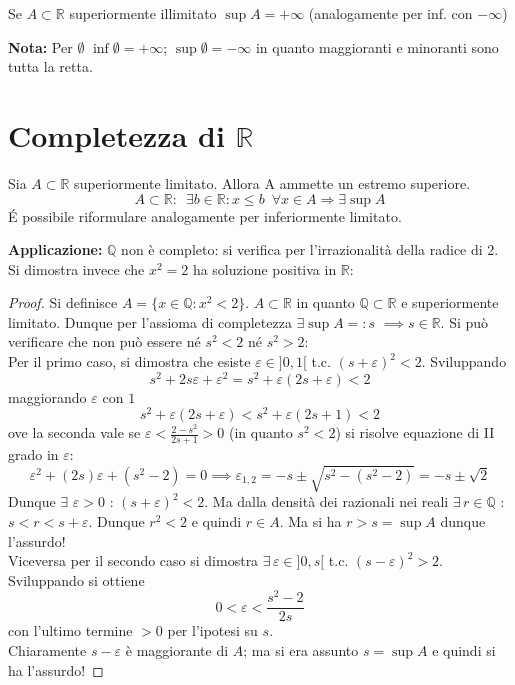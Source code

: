 \documentclass[10pt, oneside]{book}
\theoremstyle{plain}
\begin{document}
\begin{defin}
    Se $A \subset \mathbb{R}$ superiormente illimitato $\sup A = + \infty$ (analogamente per inf. con $- \infty$)
\end{defin}
\textbf{Nota: } Per $\emptyset$ $\inf \emptyset = + \infty$; $\sup \emptyset = - \infty$ in quanto maggioranti e minoranti sono tutta la retta.

\section{Completezza di \texorpdfstring{$\mathbb{R}$}{$\mathbb{R}$}}
\begin{ass}
Sia $A \subset \mathbb{R}$ superiormente limitato. Allora A ammette un estremo superiore.
\[A \subset \mathbb{R} : \enspace \exists b \in \mathbb{R}: x \leq b \enspace \forall x \in A \Longrightarrow \exists \sup A\]
\'E possibile riformulare analogamente per inferiormente limitato.
\end{ass}
\textbf{Applicazione: } $\mathbb{Q}$ non è completo: si verifica per l'irrazionalità della radice di 2. Si dimostra invece che $x^2 = 2$ ha soluzione positiva in $\mathbb{R}$:
\begin{proof}
    Si definisce $A = \{x \in \mathbb{Q} : x^2 < 2\}$. $A \subset \mathbb{R}$ in quanto $\mathbb{Q} \subset \mathbb{R}$ e superiormente limitato. Dunque per l'assioma di completezza $\exists \sup A =: s$ $\implies s \in \mathbb{R}$. Si può verificare che non può essere né $s^2 < 2$ né $s^2 > 2$:\\
Per il primo caso, si dimostra che esiste $\varepsilon \in ]0,1[$ t.c. $(s + \varepsilon)^2 < 2$. Sviluppando
\[s^2 + 2 s \varepsilon + \varepsilon^2 = s^2 + \varepsilon (2s + \varepsilon) < 2\]
maggiorando $\varepsilon$ con $1$
\[s^2 + \varepsilon (2s + \varepsilon) < s^2 + \varepsilon (2s + 1) < 2\]
ove la seconda vale se $\displaystyle \varepsilon < \frac{2 - s^2}{2s + 1} > 0$ (in quanto $s^2 < 2$) si risolve equazione di II grado in $\varepsilon$:
\[\varepsilon^2 + (2 s) \varepsilon + (s^2 - 2) = 0 \implies \varepsilon_{1,2} = - s \pm \sqrt{s^2 - (s^2 - 2)} = - s \pm \sqrt{2}\]
Dunque $\exists$ $\varepsilon > 0$ : $(s+\varepsilon)^2 < 2$. Ma dalla densità dei razionali nei reali $\exists \, r \in \mathbb{Q}$ : $s < r < s + \varepsilon$. Dunque $r^2 < 2$ e quindi $r \in A$. Ma si ha $r > s = \sup A$ dunque l'assurdo!\\
Viceversa per il secondo caso si dimostra $\exists \, \varepsilon \in ]0,s[$ t.c. $(s-\varepsilon)^2 > 2$.\\
Sviluppando si ottiene
\[0 < \varepsilon < \frac{s^2 - 2}{2s}\]
con l'ultimo termine $>0$ per l'ipotesi su $s$.\\
Chiaramente $s-\varepsilon$ è maggiorante di $A$; ma si era assunto $s = \sup A$ e quindi si ha l'assurdo!
\end{proof}
\end{document}
